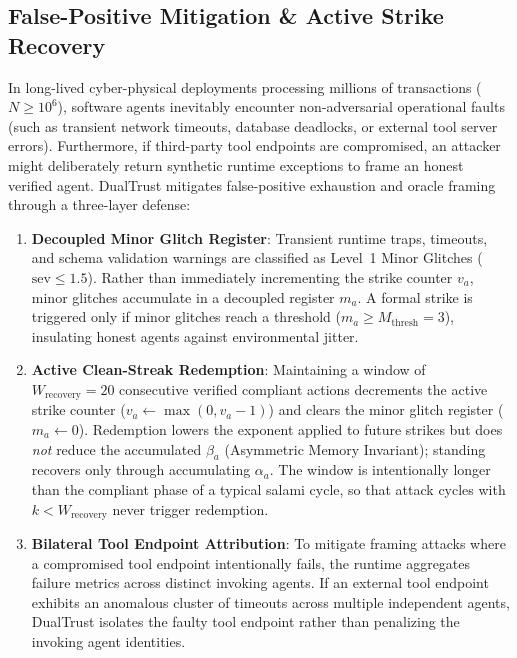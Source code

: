 \documentclass[manuscript, screen, review]{jair}
\begin{document}
\subsection{False-Positive Mitigation \& Active Strike Recovery}
\label{sec:strike_recovery}
In long-lived cyber-physical deployments processing millions of transactions ($N \ge 10^6$), software agents inevitably encounter non-adversarial operational faults (such as transient network timeouts, database deadlocks, or external tool server errors). Furthermore, if third-party tool endpoints are compromised, an attacker might deliberately return synthetic runtime exceptions to frame an honest verified agent. DualTrust mitigates false-positive exhaustion and oracle framing through a three-layer defense:
\begin{enumerate}[leftmargin=12pt, topsep=2pt, itemsep=1pt]
\item \textbf{Decoupled Minor Glitch Register}: Transient runtime traps, timeouts, and schema validation warnings are classified as Level~1 Minor Glitches ($\text{sev} \le 1.5$). Rather than immediately incrementing the strike counter $v_a$, minor glitches accumulate in a decoupled register $m_a$. A formal strike is triggered only if minor glitches reach a threshold ($m_a \ge M_{\text{thresh}} = 3$), insulating honest agents against environmental jitter.
\item \textbf{Active Clean-Streak Redemption}: Maintaining a window of $W_{\text{recovery}} = 20$ consecutive verified compliant actions decrements the active strike counter ($v_a \leftarrow \max(0, v_a - 1)$) and clears the minor glitch register ($m_a \leftarrow 0$). Redemption lowers the exponent applied to future strikes but does \emph{not} reduce the accumulated $\beta_a$ (Asymmetric Memory Invariant); standing recovers only through accumulating $\alpha_a$. The window is intentionally longer than the compliant phase of a typical salami cycle, so that attack cycles with $k < W_{\text{recovery}}$ never trigger redemption.
\item \textbf{Bilateral Tool Endpoint Attribution}: To mitigate framing attacks where a compromised tool endpoint intentionally fails, the runtime aggregates failure metrics across distinct invoking agents. If an external tool endpoint exhibits an anomalous cluster of timeouts across multiple independent agents, DualTrust isolates the faulty tool endpoint rather than penalizing the invoking agent identities.
\end{enumerate}
\end{document}
